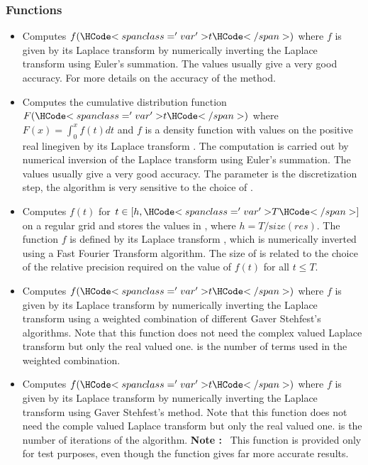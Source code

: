 \subsubsection{Functions}
\begin{itemize}
\item {}
  \sshortdescribe Computes $f(\var{t})$ where $f$ is given by its Laplace
  transform  by numerically inverting the Laplace transform using
  Euler's summation. The values  usually give a very good
  accuracy. For more details on the accuracy of the method. 

\item {}
  \sshortdescribe Computes the cumulative distribution function $F(\var{t})$
  where $F(x) = \int_0^x f(t) dt$ and $f$ is a density function with values on
  the positive real linegiven by its Laplace transform . The
  computation is carried out by numerical inversion of the Laplace transform
  using Euler's summation. The values  usually give a very
  good accuracy. The parameter  is the discretization step, the
  algorithm is very sensitive to the choice of .

\item {}
  \sshortdescribe Computes $f(t)$ for $t \in [h, \var{T}]$ on a regular grid
  and stores the values in , where $h = T / {\mathrm size}(res)$. The
  function $f$ is defined by its Laplace transform , which is
  numerically inverted using a Fast Fourier Transform algorithm. The size of
   is related to the choice of the relative precision 
  required on the value of $f(t)$ for all $t \le T$.

\item {}
  \sshortdescribe Computes $f(\var{t})$ where $f$ is given by its Laplace
  transform  by numerically inverting the Laplace transform using a
  weighted combination of different Gaver Stehfest's algorithms. Note that
  this function does not need the complex valued Laplace transform but only the
  real valued one.  is the number of terms used in the weighted combination.

\item {}
  \sshortdescribe Computes $f(\var{t})$ where $f$ is given by its Laplace
  transform  by numerically inverting the Laplace transform using
  Gaver Stehfest's method. Note that this function does not
  need the comple valued Laplace transform but only the real valued
  one.  is the number of iterations of the algorithm.
  {\bf Note : }~This function is provided only for test purposes, even though
  the function  gives far more accurate results.
\end{itemize}


